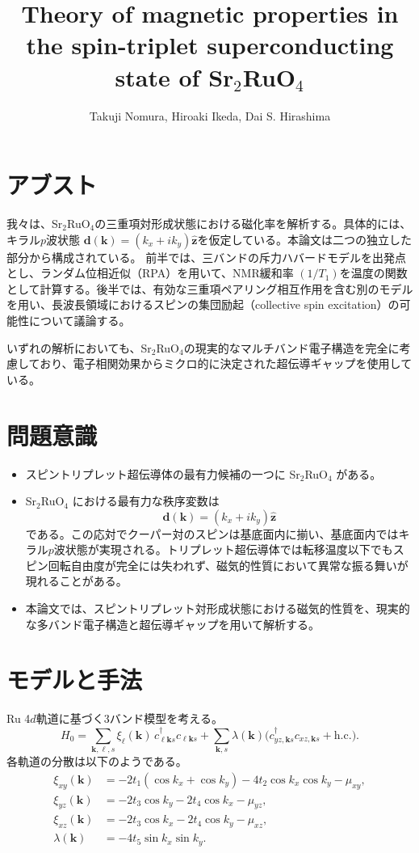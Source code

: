 \documentclass[a4paper,11pt]{jsarticle}
\title{Theory of magnetic properties in the spin-triplet superconducting state of Sr$_2$RuO$_4$}
\author{Takuji Nomura, Hiroaki Ikeda, Dai S. Hirashima}
\date{}
\begin{document}
\maketitle

\section*{アブスト}
我々は、Sr$_2$RuO$_4$の三重項対形成状態における磁化率を解析する。具体的には、キラル$p$波状態
$\bm{d}(\bm{k})=(k_x + i k_y)\hat{\bm{z}}$を仮定している。本論文は二つの独立した部分から構成されている。  
前半では、三バンドの斥力ハバードモデルを出発点とし、ランダム位相近似（RPA）を用いて、NMR緩和率
$(1/T_1)$を温度の関数として計算する。後半では、有効な三重項ペアリング相互作用を含む別のモデルを用い、長波長領域におけるスピンの集団励起（collective spin excitation）の可能性について議論する。  

いずれの解析においても、Sr$_2$RuO$_4$の現実的なマルチバンド電子構造を完全に考慮しており、電子相関効果からミクロ的に決定された超伝導ギャップを使用している。

\section{問題意識}
\begin{itemize}
  \item スピントリプレット超伝導体の最有力候補の一つに Sr$_2$RuO$_4$ がある。
  \item Sr$_2$RuO$_4$ における最有力な秩序変数は
    \[
      \bm{d}(\bm{k}) = (k_x + i k_y)\hat{\bm{z}}
    \]
    である。この応対でクーパー対のスピンは基底面内に揃い、基底面内ではキラル$p$波状態が実現される。トリプレット超伝導体では転移温度以下でもスピン回転自由度が完全には失われず、磁気的性質において異常な振る舞いが現れることがある。
  \item 本論文では、スピントリプレット対形成状態における磁気的性質を、現実的な多バンド電子構造と超伝導ギャップを用いて解析する。
\end{itemize}

\section{モデルと手法}
Ru 4$d$軌道に基づく3バンド模型を考える。
\begin{equation}
H_0 = \sum_{\bm{k}, \ell, s} \xi_\ell(\bm{k}) \, c^\dagger_{\ell \bm{k} s} c_{\ell \bm{k} s}
      + \sum_{\bm{k}, s} \lambda(\bm{k})
      \bigl(c^\dagger_{yz,\bm{k}s} c_{xz,\bm{k}s} + \mathrm{h.c.}\bigr).
\end{equation}
各軌道の分散は以下のようである。
\begin{align}
\xi_{xy}(\bm{k}) &= -2t_1(\cos k_x + \cos k_y) - 4t_2 \cos k_x \cos k_y - \mu_{xy},\\
\xi_{yz}(\bm{k}) &= -2t_3 \cos k_y - 2t_4 \cos k_x - \mu_{yz},\\
\xi_{xz}(\bm{k}) &= -2t_3 \cos k_x - 2t_4 \cos k_y - \mu_{xz},\\
\lambda(\bm{k})  &= -4t_5 \sin k_x \sin k_y.
\end{align}
\end{document}
